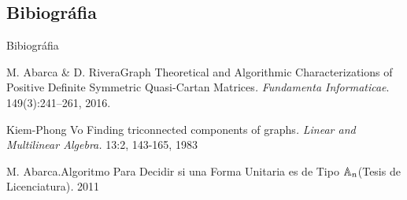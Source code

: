 \documentclass[spanish]{beamer}
\begin{document}
\subsection*{Bibiográfia}
\begin{frame}[allowframebreaks]{Bibiográfia}

\beamertemplatebookbibitems
\begin{thebibliography}{1}

M. Abarca \& D. Rivera\newblock Graph Theoretical and 
Algorithmic Characterizations of Positive Definite Symmetric Quasi-Cartan 
Matrices\emph{.}
\newblock\emph{Fundamenta Informaticae}. 149(3):241--261, 2016.

Kiem-Phong Vo \newblock Finding triconnected components of graphs\emph{.}
\newblock\emph{Linear and Multilinear Algebra.} 13:2, 143-165, 1983

M. Abarca.\newblock Algoritmo Para Decidir si una
Forma Unitaria es de Tipo $\mathbb{A}_{n}$(Tesis de Licenciatura)\emph{.} 2011

\end{thebibliography}
\end{frame}
\end{document}

